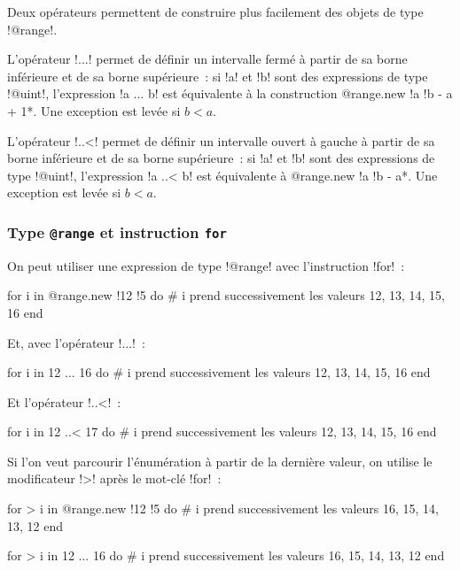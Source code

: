 
Deux opérateurs permettent de construire plus facilement des objets de type \ggs!@range!.

L'opérateur \ggs!...! permet de définir un intervalle fermé à partir de sa borne inférieure et de sa borne supérieure~: si \ggs!a! et \ggs!b! sont des expressions de type \ggs!@uint!, l'expression \ggs!a ... b! est équivalente à la construction \ggs*@range.new {!a !b - a + 1}*. Une exception est levée si $b < a$. 

L'opérateur \ggs!..<! permet de définir un intervalle ouvert à gauche à partir de sa borne inférieure et de sa borne supérieure~: si \ggs!a! et \ggs!b! sont des expressions de type \ggs!@uint!, l'expression \ggs!a ..< b! est équivalente à \ggs*@range.new {!a !b - a}*. Une exception est levée si $b < a$.

\subsubsection{Type \texttt{@range} et instruction \texttt{for}}

On peut utiliser une expression de type \ggs!@range! avec l'instruction \ggs!for!~:

\begin{galgas}
for i in @range.new {!12 !5} do
  # i prend successivement les valeurs 12, 13, 14, 15, 16
end
\end{galgas}

Et, avec l'opérateur \ggs!...!~:
\begin{galgas}
for i in 12 ... 16 do
  # i prend successivement les valeurs 12, 13, 14, 15, 16
end
\end{galgas}

Et l'opérateur \ggs!..<!~:
\begin{galgas}
for i in 12 ..< 17 do
  # i prend successivement les valeurs 12, 13, 14, 15, 16
end
\end{galgas}

Si l'on veut parcourir l'énumération à partir de la dernière valeur, on utilise le modificateur \ggs!>! après le mot-clé \ggs!for!~:
\begin{galgas}
for > i in @range.new {!12 !5} do
  # i prend successivement les valeurs 16, 15, 14, 13, 12
end
\end{galgas}
 
\begin{galgas}
for > i in 12 ... 16 do
  # i prend successivement les valeurs 16, 15, 14, 13, 12
end
\end{galgas}
 
